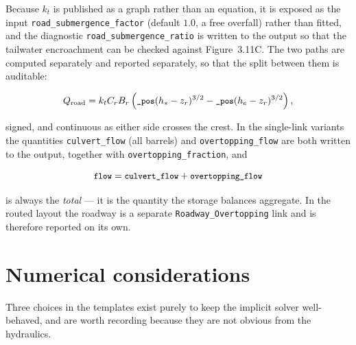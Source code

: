 \documentclass[11pt,a4paper]{article}
\newcommand{\code}[1]{\texttt{\small #1}}
\begin{document}
Because $k_t$ is published as a graph rather than an equation, it is exposed as
the input \code{road\_submergence\_factor} (default $1.0$, a free overfall)
rather than fitted, and the diagnostic \code{road\_submergence\_ratio} is
written to the output so that the tailwater encroachment can be checked against
Figure~3.11C. The two paths are computed separately and reported separately, so
that the split between them is auditable:

\begin{equation}
Q_{\mathrm{road}}=k_t C_r B_r\left(\text{\code{\_pos}}(h_s-z_r)^{3/2}
                              -\text{\code{\_pos}}(h_e-z_r)^{3/2}\right),
\label{eq:road}
\end{equation}

\noindent
signed, and continuous as either side crosses the crest. In the single-link
variants the quantities \code{culvert\_flow} (all barrels) and
\code{overtopping\_flow} are both written to the output, together with
\code{overtopping\_fraction}, and

\begin{equation}
\code{flow}=\code{culvert\_flow}+\code{overtopping\_flow}
\end{equation}

\noindent
is always the \emph{total} --- it is the quantity the storage balances
aggregate. In the routed layout the roadway is a separate
\code{Roadway\_Overtopping} link and is therefore reported on its own.

\section{Numerical considerations}

Three choices in the templates exist purely to keep the implicit solver
well-behaved, and are worth recording because they are not obvious from the
hydraulics.
\end{document}
